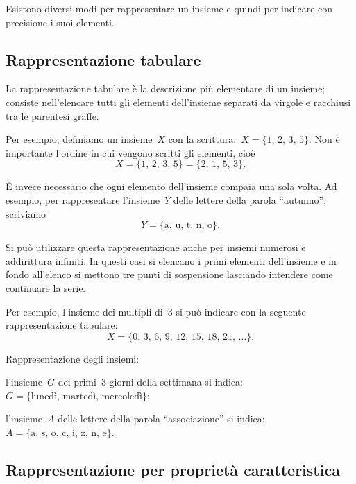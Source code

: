 Esistono diversi modi per rappresentare un insieme e quindi per indicare
con precisione i suoi elementi.

\subsection{Rappresentazione tabulare}

La rappresentazione tabulare è la descrizione più elementare di un
insieme; consiste nell'elencare tutti gli elementi dell'insieme separati da virgole e racchiusi tra le
parentesi graffe.

Per esempio, definiamo un insieme~$X$ con la scrittura:~$X=\{\text{1, 2, 3, 5}\}$.
Non è importante l'ordine in cui vengono scritti gli elementi, cioè
\[X=\{\text{1, 2, 3, 5}\}=\{\text{2, 1, 5, 3}\}.\]

È invece necessario che ogni elemento dell'insieme compaia una sola volta. Ad esempio, per rappresentare
l'insieme~$Y$ delle lettere della parola ``autunno'', scriviamo
\[Y = \{\text{a, u, t, n, o}\}.\]

Si può utilizzare questa rappresentazione anche per insiemi numerosi e addirittura infiniti. In questi casi si elencano i primi elementi
dell'insieme e in fondo all'elenco si mettono tre punti di sospensione lasciando intendere come continuare la serie.

Per esempio, l'insieme dei multipli di~3 si può indicare con la seguente rappresentazione tabulare:
\[X=\{\text{0, 3, 6, 9, 12, 15, 18, 21, }\ldots\}.\]


\begin{exrig}
 \begin{esempio}
Rappresentazione degli insiemi:
 \begin{enumeratea}
\item l'insieme~$G$ dei primi~3 giorni della settimana si indica:~$G=\{\text{lunedì, martedì, mercoledì}\}$;
\item l'insieme~$A$ delle lettere della parola ``associazione'' si indica:~$A=\{\text{a, s, o, c, i, z, n, e}\}$.
\end{enumeratea}
 \end{esempio}
\end{exrig}

\ovalbox{\risolvii \ref{ese:5.15}, \ref{ese:5.16}, \ref{ese:5.17}, \ref{ese:5.18}}

\subsection{Rappresentazione per proprietà caratteristica}

